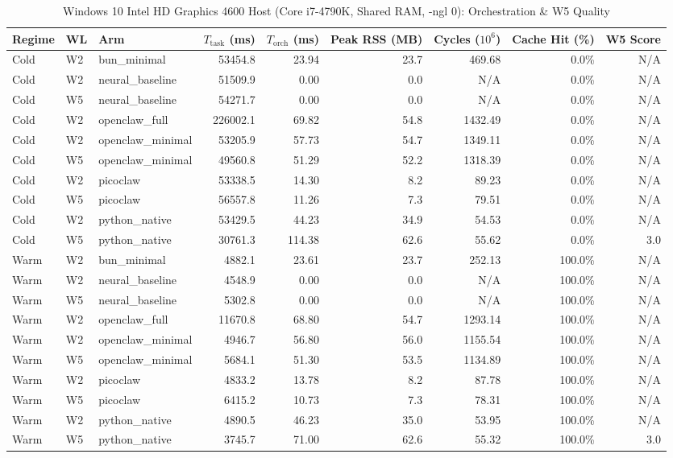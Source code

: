 \begin{table}[t]
\centering\small
\caption{Windows 10 Intel HD Graphics 4600 Host (Core i7-4790K, Shared RAM, -ngl 0): Orchestration & W5 Quality}
\begin{tabular}{lllrrrrrr}
\toprule
Regime & WL & Arm & $T_{\text{task}}$ (ms) & $T_{\text{orch}}$ (ms) & Peak RSS (MB) & Cycles ($10^6$) & Cache Hit (\%) & W5 Score \\
\midrule
Cold & W2 & bun\_minimal & 53454.8 & 23.94 & 23.7 & 469.68 & 0.0\% & N/A \\
Cold & W2 & neural\_baseline & 51509.9 & 0.00 & 0.0 & N/A & 0.0\% & N/A \\
Cold & W5 & neural\_baseline & 54271.7 & 0.00 & 0.0 & N/A & 0.0\% & N/A \\
Cold & W2 & openclaw\_full & 226002.1 & 69.82 & 54.8 & 1432.49 & 0.0\% & N/A \\
Cold & W2 & openclaw\_minimal & 53205.9 & 57.73 & 54.7 & 1349.11 & 0.0\% & N/A \\
Cold & W5 & openclaw\_minimal & 49560.8 & 51.29 & 52.2 & 1318.39 & 0.0\% & N/A \\
Cold & W2 & picoclaw & 53338.5 & 14.30 & 8.2 & 89.23 & 0.0\% & N/A \\
Cold & W5 & picoclaw & 56557.8 & 11.26 & 7.3 & 79.51 & 0.0\% & N/A \\
Cold & W2 & python\_native & 53429.5 & 44.23 & 34.9 & 54.53 & 0.0\% & N/A \\
Cold & W5 & python\_native & 30761.3 & 114.38 & 62.6 & 55.62 & 0.0\% & 3.0 \\
Warm & W2 & bun\_minimal & 4882.1 & 23.61 & 23.7 & 252.13 & 100.0\% & N/A \\
Warm & W2 & neural\_baseline & 4548.9 & 0.00 & 0.0 & N/A & 100.0\% & N/A \\
Warm & W5 & neural\_baseline & 5302.8 & 0.00 & 0.0 & N/A & 100.0\% & N/A \\
Warm & W2 & openclaw\_full & 11670.8 & 68.80 & 54.7 & 1293.14 & 100.0\% & N/A \\
Warm & W2 & openclaw\_minimal & 4946.7 & 56.80 & 56.0 & 1155.54 & 100.0\% & N/A \\
Warm & W5 & openclaw\_minimal & 5684.1 & 51.30 & 53.5 & 1134.89 & 100.0\% & N/A \\
Warm & W2 & picoclaw & 4833.2 & 13.78 & 8.2 & 87.78 & 100.0\% & N/A \\
Warm & W5 & picoclaw & 6415.2 & 10.73 & 7.3 & 78.31 & 100.0\% & N/A \\
Warm & W2 & python\_native & 4890.5 & 46.23 & 35.0 & 53.95 & 100.0\% & N/A \\
Warm & W5 & python\_native & 3745.7 & 71.00 & 62.6 & 55.32 & 100.0\% & 3.0 \\
\bottomrule
\end{tabular}
\end{table}
